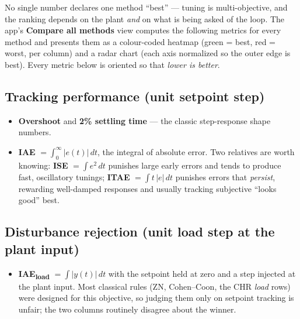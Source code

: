 \documentclass[11pt]{article}
\begin{document}
No single number declares one method ``best'' --- tuning is multi-objective,
and the ranking depends on the plant \emph{and} on what is being asked of the
loop. The app's \textbf{Compare all methods} view computes the following
metrics for every method and presents them as a colour-coded heatmap (green =
best, red = worst, per column) and a radar chart (each axis normalized so the
outer edge is best). Every metric below is oriented so that \emph{lower is
better}.

\subsection*{Tracking performance (unit setpoint step)}
\begin{itemize}[leftmargin=1.4em,itemsep=0.15em]
  \item \textbf{Overshoot} and \textbf{2\% settling time} --- the classic
        step-response shape numbers.
  \item \textbf{IAE} $=\int_0^\infty |e(t)|\,dt$, the integral of absolute
        error. Two relatives are worth knowing: \textbf{ISE}
        $=\int e^2\,dt$ punishes large early errors and tends to produce fast,
        oscillatory tunings; \textbf{ITAE} $=\int t\,|e|\,dt$ punishes errors
        that \emph{persist}, rewarding well-damped responses and usually
        tracking subjective ``looks good'' best.
\end{itemize}

\subsection*{Disturbance rejection (unit load step at the plant input)}
\begin{itemize}[leftmargin=1.4em,itemsep=0.15em]
  \item \textbf{IAE\textsubscript{load}} $=\int |y(t)|\,dt$ with the setpoint
        held at zero and a step injected at the plant input. Most classical
        rules (ZN, Cohen--Coon, the CHR \emph{load} rows) were designed for
        this objective, so judging them only on setpoint tracking is unfair;
        the two columns routinely disagree about the winner.
\end{itemize}
\end{document}
